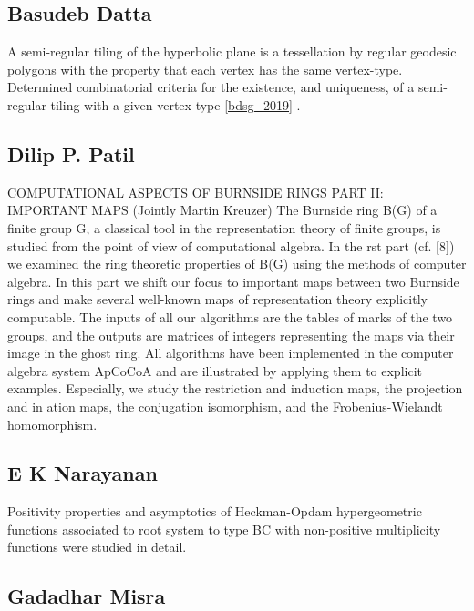 \subsection{Basudeb Datta}

A semi-regular tiling of the hyperbolic plane is a tessellation by regular geodesic polygons with the property that each vertex has the same vertex-type. Determined combinatorial criteria for the existence, and uniqueness, of a semi-regular tiling with a given vertex-type \ref{bdsg_2019} .


\subsection{Dilip P. Patil}

COMPUTATIONAL ASPECTS OF BURNSIDE RINGS PART II: IMPORTANT MAPS (Jointly Martin  Kreuzer)   The Burnside ring B(G) of a finite group G, a classical tool in the representation theory of finite groups, is studied from the point of view of computational algebra. In the rst part (cf. [8]) we examined the ring theoretic properties of B(G) using the methods of computer algebra. In this part we shift our focus to important maps between two Burnside rings and make several well-known maps of representation theory explicitly computable. The inputs of all our algorithms are the tables of marks of the two groups, and the outputs are matrices of integers representing the maps via their image in the ghost ring. All algorithms have been implemented in the computer algebra system ApCoCoA and are illustrated by applying them to explicit examples. Especially, we study the restriction and induction maps, the projection and in ation maps, the conjugation isomorphism, and the Frobenius-Wielandt homomorphism.


\subsection{E K Narayanan}

Positivity properties and asymptotics of Heckman-Opdam hypergeometric functions associated to root system to type BC with non-positive multiplicity functions were studied in detail.


\subsection{Gadadhar Misra}

